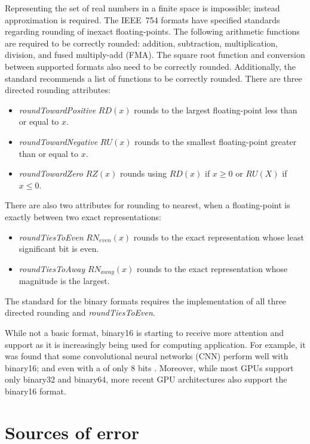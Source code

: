 Representing the set of real numbers in a finite space is impossible; instead approximation is required.
The IEEE~754 formats have specified standards regarding rounding of inexact floating-points.
The following arithmetic functions are required to be correctly rounded: addition, subtraction, multiplication, division, and fused multiply-add (FMA).
The square root function and conversion between supported formats also need to be correctly rounded.
Additionally, the standard recommends a list of functions to be correctly rounded. %
There are three directed rounding attributes:
\begin{itemize}
	\item \textit{roundTowardPositive} $RD(x)$ rounds to the largest floating-point less than or equal to $x$.
	\item \textit{roundTowardNegative} $RU(x)$ rounds to the smallest floating-point greater than or equal to $x$.
	\item \textit{roundTowardZero} $RZ(x)$ rounds using $RD(x)$ if $x \ge 0$ or $RU(X)$ if $x \le 0$.
\end{itemize}
There are also two attributes for rounding to nearest, when a floating-point is exactly between two exact representations:
\begin{itemize}
	\item \textit{roundTiesToEven} $RN_{even}(x)$ rounds to the exact representation whose least significant bit is even.
	\item \textit{roundTiesToAway} $RN_{away}(x)$ rounds to the exact representation whose magnitude is the largest.
\end{itemize}
The standard for the binary formats requires the implementation of all three directed rounding and \textit{roundTiesToEven}.
				
While not a basic format, binary16 is starting to receive more attention and support as it is increasingly being used for computing application.
For example, it was found that some convolutional neural networks (CNN) perform well with binary16; and even with a  of only 8 bits .
Moreover, while most GPUs support only binary32 and binary64, more recent GPU architectures also support the binary16 format.
				
\section{Sources of error}
\begin{comment}
- rounding & double rounding
- cancellation
- overflow & underflow
- accumulation
- swamping

\end{comment}
